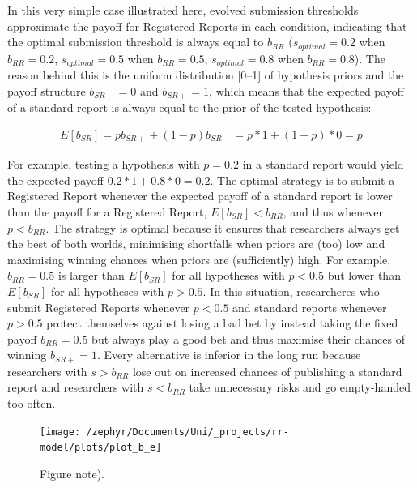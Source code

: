 \documentclass[british,,man,floatsintext]{apa6}
\begin{document}
In this very simple case illustrated here, evolved submission thresholds approximate the payoff for Registered Reports in each condition, indicating that the optimal submission threshold is always equal to \(b_{RR}\) (\(s_{optimal} = 0.2\) when \(b_{RR} = 0.2\), \(s_{optimal} = 0.5\) when \(b_{RR} = 0.5\), \(s_{optimal} = 0.8\) when \(b_{RR} = 0.8\)).
The reason behind this is the uniform distribution {[}0--1{]} of hypothesis priors and the payoff structure \(b_{SR-} = 0\) and \(b_{SR+} = 1\), which means that the expected payoff of a standard report is always equal to the prior of the tested hypothesis:

\begin{align}
E[b_{SR}] = p b_{SR+} + (1-p)b_{SR-} = p * 1 +  (1-p) * 0 = p
\end{align}

For example, testing a hypothesis with \(p = 0.2\) in a standard report would yield the expected payoff \(0.2 * 1 + 0.8 * 0 = 0.2\).
The optimal strategy is to submit a Registered Report whenever the expected payoff of a standard report is lower than the payoff for a Registered Report, \(E[b_{SR}] < b_{RR}\), and thus whenever \(p < b_{RR}\).
The strategy is optimal because it ensures that researchers always get the best of both worlds, minimising shortfalls when priors are (too) low and maximising winning chances when priors are (sufficiently) high.
For example, \(b_{RR} = 0.5\) is larger than \(E[b_{SR}]\) for all hypotheses with \(p < 0.5\) but lower than \(E[b_{SR}]\) for all hypotheses with \(p > 0.5\).
In this situation, researcheres who submit Registered Reports whenever \(p<0.5\) and standard reports whenever \(p>0.5\) protect themselves against losing a bad bet by instead taking the fixed payoff \(b_{RR} = 0.5\) but always play a good bet and thus maximise their chances of winning \(b_{SR+} = 1\).
Every alternative is inferior in the long run because researchers with \(s > b_{RR}\) lose out on increased chances of publishing a standard report and researchers with \(s < b_{RR}\) take unnecessary risks and go empty-handed too often.



\begin{figure}

{\centering \texttt{[image: /zephyr/Documents/Uni/\_projects/rr-model/plots/plot\_b\_e]} 

}

\caption{Figure note).}\label{fig:epsilonplot}
\end{figure}
\end{document}
